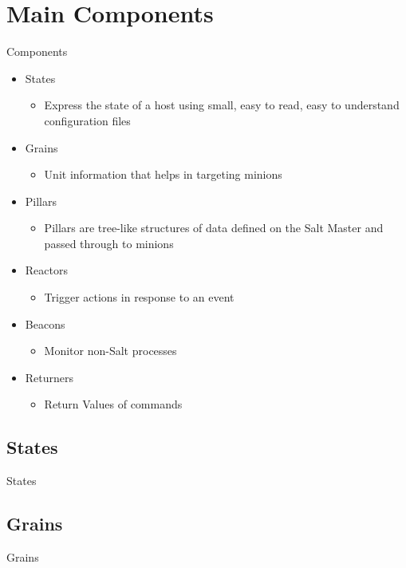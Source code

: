 \documentclass[pdf]{beamer}
\begin{document}
	\section{Main Components}
	\begin{frame}{Components}
		\begin{itemize}
			\item States
			\pause
			\begin{itemize}
				\item Express the state of a host using small, easy to read, 
			easy to understand configuration files
			\end{itemize}
			\pause
			\item Grains
			\pause
			\begin{itemize}
				\item Unit information that helps in targeting
					minions
			\end{itemize}
			\pause 
			\item Pillars
			\pause
			\begin{itemize}
				\item Pillars are tree-like structures of data 
					defined on the Salt Master and passed through to minions
			\end{itemize}
			\pause
			\item Reactors
			\pause
			\begin{itemize}
				\item Trigger actions in response to an event
			\end{itemize}
			\pause
			\item Beacons
			\pause
			\begin{itemize}
				\item Monitor non-Salt processes
			\end{itemize}
			\pause
			\item Returners
			\pause
			\begin{itemize}
				\item Return Values of commands
			\end{itemize}
		\end{itemize}
	\end{frame}

	\subsection{States}
	\begin{frame}{States}
	\end{frame}

	\subsection{Grains}
	\begin{frame}{Grains}
	\end{frame}
	
\end{document}
